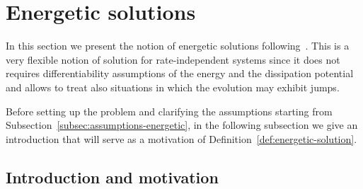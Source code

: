 \documentclass[a4paper,10pt,twoside]{amsbook}
\numberwithin{section}{chapter}
\numberwithin{equation}{chapter}
\theoremstyle{definition}
\begin{document}
\section{Energetic solutions}
\label{sec:energetic-solution}

In this section we present the notion of energetic solutions following~\cite{francfort,rate-independent-systems}. This is a very flexible notion of solution for rate-independent systems since it does not requires differentiability assumptions of the energy and the dissipation potential and allows to treat also situations in which the evolution may exhibit jumps.

Before setting up the problem and clarifying the assumptions starting from Subsection~\ref{subsec:assumptions-energetic}, in the following subsection we give an introduction that will serve as a motivation of Definition~\ref{def:energetic-solution}.

\subsection{Introduction and motivation}
\end{document}
